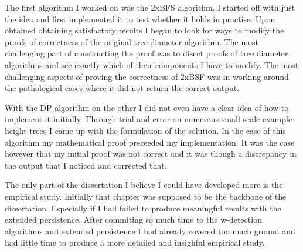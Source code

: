 The first algorithm I worked on was the 2xBFS algorithm. I started off with just the idea and first implemented it to test whether it holds in practise. Upon obtained obtaining satisfactory results I began to look for ways to modify the proofs of correctness of the original tree diameter algorithm. The most challenging part of constructing the proof was to disect proofs of tree diameter algorithms and see exactly which of their components I have to modify. The most challenging aspects of proving the correctness of 2xBSF was in working around the pathological cases where it did not return the correct output.

%

With the DP algorithm on the other I did not even have a clear idea of how to implement it initially. Through trial and error on numerous small scale example height trees I came up with the formulation of the solution. In the case of this algorithm my mathematical proof preceeded my implementation. It was the case however that my initial proof was not correct and it was though a discrepancy in the output that I noticed and corrected that.

The only part of the dissertation I believe I could have developed more is the empirical study. Initially that chapter was supposed to be the backbone of the dissertation. Especially if I had failed to produce meaningful results with the extended persistence. After commiting so much time to the w-detection algorithms and extended persistence I had already covered too much ground and had little time to produce a more detailed and insighful empirical study.

